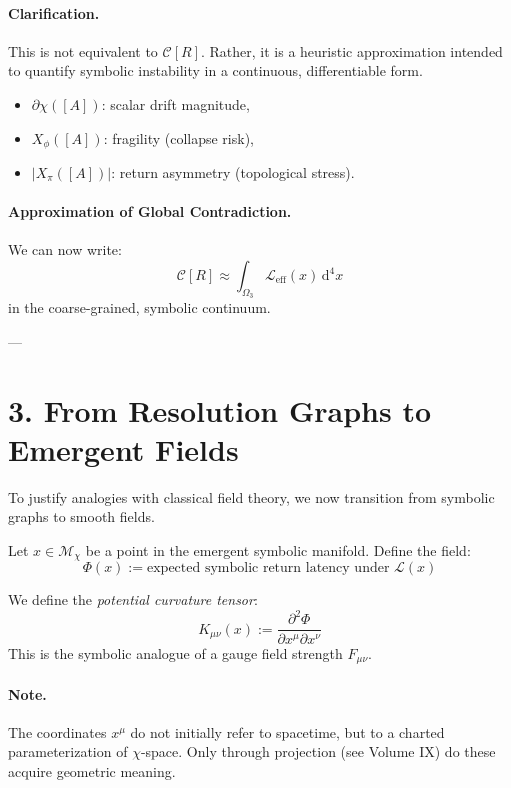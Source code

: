 \paragraph{Clarification.}
This is not equivalent to $\mathcal{C}[R]$. Rather, it is a heuristic approximation intended to quantify symbolic instability in a continuous, differentiable form.

\begin{itemize}
  \item $\partial\chi([A])$: scalar drift magnitude,
  \item $X_\phi([A])$: fragility (collapse risk),
  \item $|X_\pi([A])|$: return asymmetry (topological stress).
\end{itemize}

\paragraph{Approximation of Global Contradiction.}
We can now write:
\[
\mathcal{C}[R] \approx \int_{\Omega_3} \mathcal{L}_{\text{eff}}(x) \, \mathrm{d}^4x
\]
in the coarse-grained, symbolic continuum.

---

\section{3. From Resolution Graphs to Emergent Fields}
\label{sec:field-approximation}

To justify analogies with classical field theory, we now transition from symbolic graphs to smooth fields.

\begin{definition}
\label{def:coherence-potential}
Let $x \in \mathcal{M}_\chi$ be a point in the emergent symbolic manifold. Define the field:
\[
\Phi(x) := \text{expected symbolic return latency under $\mathcal{L}(x)$}
\]
\end{definition}

\begin{definition}
We define the \emph{potential curvature tensor}:
\[
K_{\mu\nu}(x) := \frac{\partial^2 \Phi}{\partial x^\mu \partial x^\nu}
\]
This is the symbolic analogue of a gauge field strength $F_{\mu\nu}$.
\end{definition}

\paragraph{Note.}
The coordinates $x^\mu$ do not initially refer to spacetime, but to a charted parameterization of $\chi$-space. Only through projection (see Volume IX) do these acquire geometric meaning.

